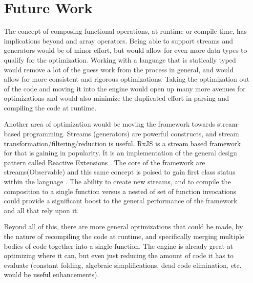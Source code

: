 \section{Future Work}

The concept of composing functional operations, at runtime or compile time, has implications beyond \javascript and array operators. Being able to support streams and generators would be of minor effort, but would allow for even more data types to qualify for the optimization.  Working with a language that is statically typed would remove a lot of the guess work from the process in general, and would allow for more consistent and rigorous optimizations.  Taking the optimization out of the \javascript code and moving it into the engine would open up many more avenues for optimizations and would also minimize the duplicated effort in parsing and compiling the \javascript code at runtime.

Another area of optimization would be moving the framework towards stream-based programming.  Streams (generators) are powerful constructs, and stream transformation/filtering/reduction is useful.  RxJS \cite{rxjs16} is a stream based framework for \javascript that is gaining in popularity. It is an implementation of the general design pattern called Reactive Extensions \cite{rxio16}. The core of the framework are streams(Observable) and this same concept is poised to gain first class status within the \javascript language \cite{observablejs16}. The ability to create new streams, and to compile the composition to a single function versus a nested of set of function invocations could provide a significant boost to the general performance of the framework and all that rely upon it. 

Beyond all of this, there are more general optimizations that could be made, by the nature of recompiling the code at runtime, and specifically merging multiple bodies of code together into a single function.  The \veight \javascript engine is already great at optimizing where it can, but even just reducing the amount of code it has to evaluate (constant folding, algebraic simplifications, dead code elimination, etc. would be useful enhancements).